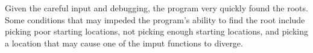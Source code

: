 \documentclass[12pt]{article}
\begin{document}
\begin{enumerate}
Given the careful input and debugging, the program very quickly found the roots. Some conditions that may impeded the program's ability to find the root include picking poor starting locations, not picking enough starting locations, and picking a location that may cause one of the imput functions to diverge. 

\end{enumerate}
\end{document}
